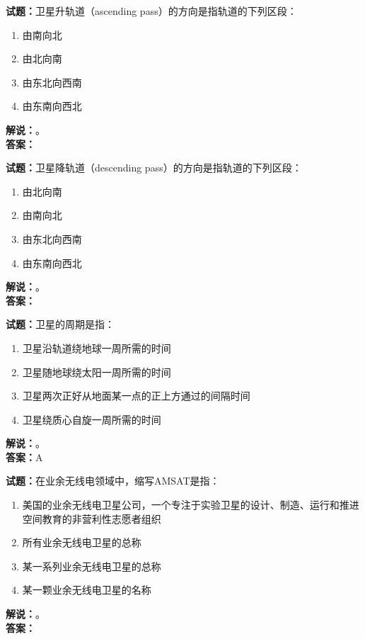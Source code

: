 \documentclass{ctexbook}
\begin{document}
\bigskip

\noindent\textbf{试题：}卫星升轨道（ascending pass）的方向是指轨道的下列区段：
\begin{enumerate}[leftmargin=3em]
  \item 由南向北
  \item 由北向南
  \item 由东北向西南
  \item 由东南向西北
\end{enumerate}
\noindent\textbf{解说：}\textbf{}。\\\noindent\textbf{答案：}

\bigskip

\noindent\textbf{试题：}卫星降轨道（descending pass）的方向是指轨道的下列区段：
\begin{enumerate}[leftmargin=3em]
  \item 由北向南
  \item 由南向北
  \item 由东北向西南
  \item 由东南向西北
\end{enumerate}
\noindent\textbf{解说：}\textbf{}。\\\noindent\textbf{答案：}

\bigskip

\noindent\textbf{试题：}卫星的周期是指：
\begin{enumerate}[leftmargin=3em]
  \item 卫星沿轨道绕地球一周所需的时间
  \item 卫星随地球绕太阳一周所需的时间
  \item 卫星两次正好从地面某一点的正上方通过的间隔时间
  \item 卫星绕质心自旋一周所需的时间
\end{enumerate}
\noindent\textbf{解说：}。\\\noindent\textbf{答案：}A

\bigskip

\noindent\textbf{试题：}在业余无线电领域中，缩写AMSAT是指：
\begin{enumerate}[leftmargin=3em]
  \item 美国的业余无线电卫星公司，一个专注于实验卫星的设计、制造、运行和推进空间教育的非营利性志愿者组织
  \item 所有业余无线电卫星的总称
  \item 某一系列业余无线电卫星的总称
  \item 某一颗业余无线电卫星的名称
\end{enumerate}
\noindent\textbf{解说：}\textbf{}。\\\noindent\textbf{答案：}
\end{document}
